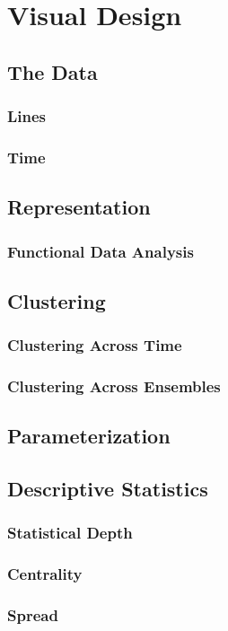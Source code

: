 \chapter{Visual Design}

\section{The Data}
\subsection{Lines}
\subsection{Time}

\section{Representation}
\subsection{Functional Data Analysis}

\section{Clustering}
\subsection{Clustering Across Time}
\subsection{Clustering Across Ensembles}

\section{Parameterization}

\section{Descriptive Statistics}
\subsection{Statistical Depth}
\subsection{Centrality}
\subsection{Spread}

